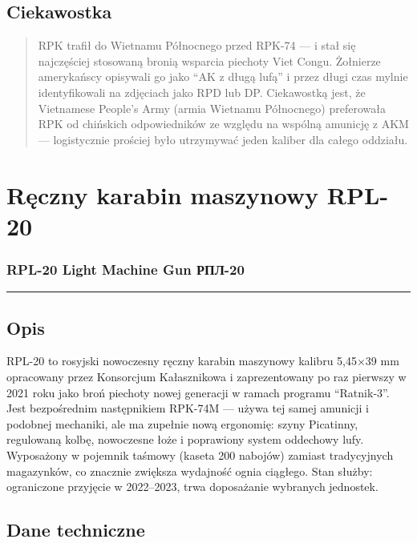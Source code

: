 \documentclass[12pt,openany,oneside]{book}
\begin{document}
\section{Ciekawostka}\label{ciekawostka-54}

\begin{quote}
RPK trafił do Wietnamu Północnego przed RPK-74 --- i stał się
najczęściej stosowaną bronią wsparcia piechoty Viet Congu. Żołnierze
amerykańscy opisywali go jako ``AK z długą lufą'' i przez długi czas
mylnie identyfikowali na zdjęciach jako RPD lub DP. Ciekawostką jest, że
Vietnamese People's Army (armia Wietnamu Północnego) preferowała RPK od
chińskich odpowiedników ze względu na wspólną amunicję z AKM ---
logistycznie prościej było utrzymywać jeden kaliber dla całego oddziału.
\end{quote}

\chapter{Ręczny karabin maszynowy
RPL-20}\label{rux119czny-karabin-maszynowy-rpl-20}

\subsection{RPL-20 Light Machine Gun \textbar{}
РПЛ-20}\label{rpl-20-light-machine-gun-ux440ux43fux43b-20}

\begin{center}\rule{0.5\linewidth}{0.5pt}\end{center}

\section{Opis}\label{opis-55}

RPL-20 to rosyjski nowoczesny ręczny karabin maszynowy kalibru 5,45×39
mm opracowany przez Konsorcjum Kałasznikowa i zaprezentowany po raz
pierwszy w 2021 roku jako broń piechoty nowej generacji w ramach
programu ``Ratnik-3''. Jest bezpośrednim następnikiem RPK-74M --- używa
tej samej amunicji i podobnej mechaniki, ale ma zupełnie nową ergonomię:
szyny Picatinny, regulowaną kolbę, nowoczesne łoże i poprawiony system
oddechowy lufy. Wyposażony w pojemnik taśmowy (kaseta 200 nabojów)
zamiast tradycyjnych magazynków, co znacznie zwiększa wydajność ognia
ciągłego. Stan służby: ograniczone przyjęcie w 2022--2023, trwa
doposażanie wybranych jednostek.

\section{Dane techniczne}\label{dane-techniczne-55}
\end{document}
